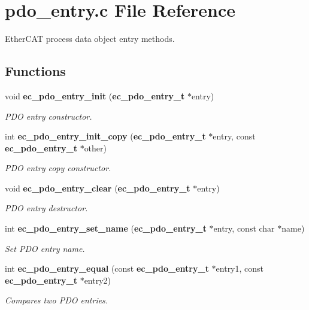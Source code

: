 \section{pdo\-\_\-entry.\-c \-File \-Reference}
\label{pdo__entry_8c}


\-Ether\-C\-A\-T process data object entry methods.  


\subsection*{\-Functions}
\begin{DoxyCompactItemize}
\item 
void {\bf ec\-\_\-pdo\-\_\-entry\-\_\-init} ({\bf ec\-\_\-pdo\-\_\-entry\-\_\-t} $\ast$entry)
\begin{DoxyCompactList}\small\item\em \-P\-D\-O entry constructor. \end{DoxyCompactList}\item 
int {\bf ec\-\_\-pdo\-\_\-entry\-\_\-init\-\_\-copy} ({\bf ec\-\_\-pdo\-\_\-entry\-\_\-t} $\ast$entry, const {\bf ec\-\_\-pdo\-\_\-entry\-\_\-t} $\ast$other)
\begin{DoxyCompactList}\small\item\em \-P\-D\-O entry copy constructor. \end{DoxyCompactList}\item 
void {\bf ec\-\_\-pdo\-\_\-entry\-\_\-clear} ({\bf ec\-\_\-pdo\-\_\-entry\-\_\-t} $\ast$entry)
\begin{DoxyCompactList}\small\item\em \-P\-D\-O entry destructor. \end{DoxyCompactList}\item 
int {\bf ec\-\_\-pdo\-\_\-entry\-\_\-set\-\_\-name} ({\bf ec\-\_\-pdo\-\_\-entry\-\_\-t} $\ast$entry, const char $\ast$name)
\begin{DoxyCompactList}\small\item\em \-Set \-P\-D\-O entry name. \end{DoxyCompactList}\item 
int {\bf ec\-\_\-pdo\-\_\-entry\-\_\-equal} (const {\bf ec\-\_\-pdo\-\_\-entry\-\_\-t} $\ast$entry1, const {\bf ec\-\_\-pdo\-\_\-entry\-\_\-t} $\ast$entry2)
\begin{DoxyCompactList}\small\item\em \-Compares two \-P\-D\-O entries. \end{DoxyCompactList}\end{DoxyCompactItemize}


